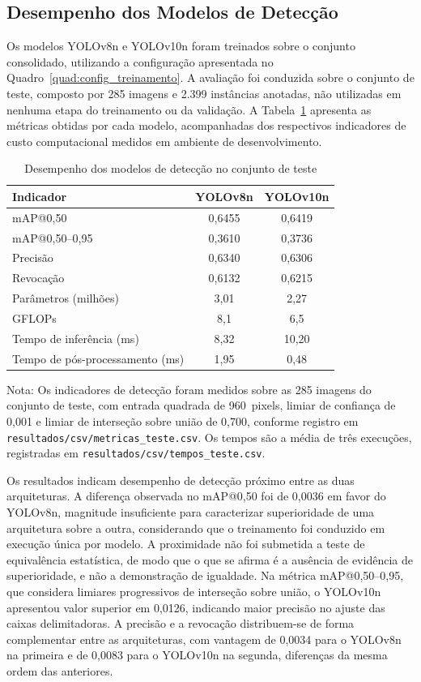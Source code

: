 \documentclass[artigo,times,capa]{iftex2024}
\newcommand{\nota}[1]{%
  \begingroup%
    \parskip=3pt%
    \par\footnotesize%
     Nota: #1\par%
  \endgroup%
}
\begin{document}
\subsection{Desempenho dos Modelos de Detecção}
\label{sec:desempenho_deteccao}

Os modelos YOLOv8n e YOLOv10n foram treinados sobre o conjunto consolidado,
utilizando a configuração apresentada no Quadro~\ref{quad:config_treinamento}. A
avaliação foi conduzida sobre o conjunto de teste, composto por 285 imagens e
2.399 instâncias anotadas, não utilizadas em nenhuma etapa do treinamento ou da
validação. A Tabela~\ref{tab:resultados_deteccao} apresenta as métricas obtidas por cada
modelo, acompanhadas dos respectivos indicadores de custo computacional medidos
em ambiente de desenvolvimento.

\begin{table}[htbp]
\centering
\caption{Desempenho dos modelos de detecção no conjunto de teste}
\label{tab:resultados_deteccao}
\begin{tabular}{lcc}
\toprule
\textbf{Indicador} & \textbf{YOLOv8n} & \textbf{YOLOv10n} \\
\midrule
\ac{mAP}@0,50 & 0,6455 & 0,6419 \\
\ac{mAP}@0,50--0,95 & 0,3610 & 0,3736 \\
Precisão & 0,6340 & 0,6306 \\ 
Revocação & 0,6132 & 0,6215 \\
\midrule
Parâmetros (milhões) & 3,01 & 2,27 \\
GFLOPs & 8,1 & 6,5 \\
Tempo de inferência (ms) & 8,32 & 10,20 \\
Tempo de pós-processamento (ms) & 1,95 & 0,48 \\
\bottomrule
\end{tabular}
\nota{Os indicadores de detecção foram medidos sobre as 285 imagens do conjunto de teste, com entrada quadrada de 960~pixels, limiar de confiança de 0,001 e limiar de interseção sobre união de 0,700, conforme registro em \texttt{resultados/csv/metricas\_teste.csv}. Os tempos são a média de três execuções, registradas em \texttt{resultados/csv/tempos\_teste.csv}.}
\end{table}

Os resultados indicam desempenho de detecção próximo entre as duas
arquiteturas. A diferença observada no \ac{mAP}@0,50 foi de 0,0036 em favor do
YOLOv8n, magnitude insuficiente para caracterizar superioridade de
uma arquitetura sobre a outra, considerando que o treinamento foi conduzido em
execução única por modelo. A proximidade não foi submetida a teste de
equivalência estatística, de modo que o que se afirma é a ausência de evidência
de superioridade, e não a demonstração de igualdade. Na métrica \ac{mAP}@0,50--0,95, que considera limiares
progressivos de interseção sobre união, o YOLOv10n apresentou valor superior em
0,0126, indicando maior precisão no ajuste das caixas delimitadoras. A precisão e a revocação
distribuem-se de forma complementar entre as arquiteturas, com vantagem de
0,0034 para o YOLOv8n na primeira e de 0,0083 para o YOLOv10n na
segunda, diferenças da mesma ordem das anteriores.
\end{document}
